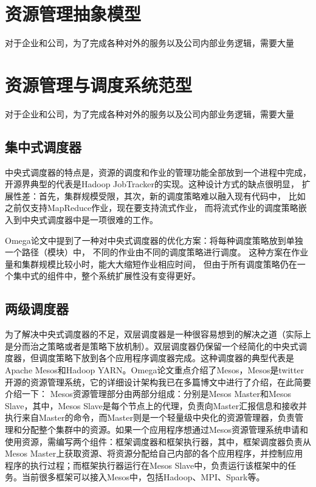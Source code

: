 \section{资源管理抽象模型}

对于企业和公司，为了完成各种对外的服务以及公司内部业务逻辑，需要大量

\section{资源管理与调度系统范型}
对于企业和公司，为了完成各种对外的服务以及公司内部业务逻辑，需要大量
\subsection{集中式调度器}
中央式调度器的特点是，资源的调度和作业的管理功能全部放到一个进程中完成，
开源界典型的代表是Hadoop JobTracker的实现。这种设计方式的缺点很明显，
扩展性差：首先，集群规模受限，其次，新的调度策略难以融入现有代码中，
比如之前仅支持MapReduce作业，现在要支持流式作业，
而将流式作业的调度策略嵌入到中央式调度器中是一项很难的工作。

Omega论文中提到了一种对中央式调度器的优化方案：将每种调度策略放到单独一个路径（模块）中，
不同的作业由不同的调度策略进行调度。
这种方案在作业量和集群规模比较小时，能大大缩短作业相应时间，
但由于所有调度策略仍在一个集中式的组件中，整个系统扩展性没有变得更好。

\subsection{两级调度器}
为了解决中央式调度器的不足，双层调度器是一种很容易想到的解决之道（实际上是分而治之策略或者是策略下放机制）。双层调度器仍保留一个经简化的中央式调度器，但调度策略下放到各个应用程序调度器完成。这种调度器的典型代表是Apache Mesos和Hadoop YARN。Omega论文重点介绍了Mesos，Mesos是twitter开源的资源管理系统，它的详细设计架构我已在多篇博文中进行了介绍，在此简要介绍一下：
Mesos资源管理部分由两部分组成：分别是Mesos Master和Mesos Slave，其中，Mesos Slave是每个节点上的代理，负责向Master汇报信息和接收并执行来自Master的命令，而Master则是一个轻量级中央化的资源管理器，负责管理和分配整个集群中的资源。如果一个应用程序想通过Mesos资源管理系统申请和使用资源，需编写两个组件：框架调度器和框架执行器，其中，框架调度器负责从Mesos Master上获取资源、将资源分配给自己内部的各个应用程序，并控制应用程序的执行过程；而框架执行器运行在Mesos Slave中，负责运行该框架中的任务。当前很多框架可以接入Mesos中，包括Hadoop、MPI、Spark等。

